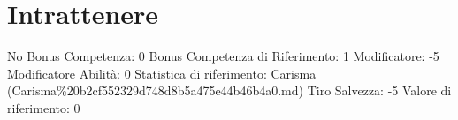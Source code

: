 \section{Intrattenere}\label{intrattenere}

\begin{description}
\tightlist
\item[Tags: ABI]
No Bonus Competenza: 0 Bonus Competenza di Riferimento: 1 Modificatore:
-5 Modificatore Abilità: 0 Statistica di riferimento: Carisma
(Carisma\%20b2cf552329d748d8b5a475e44b46b4a0.md) Tiro Salvezza: -5
Valore di riferimento: 0
\end{description}
